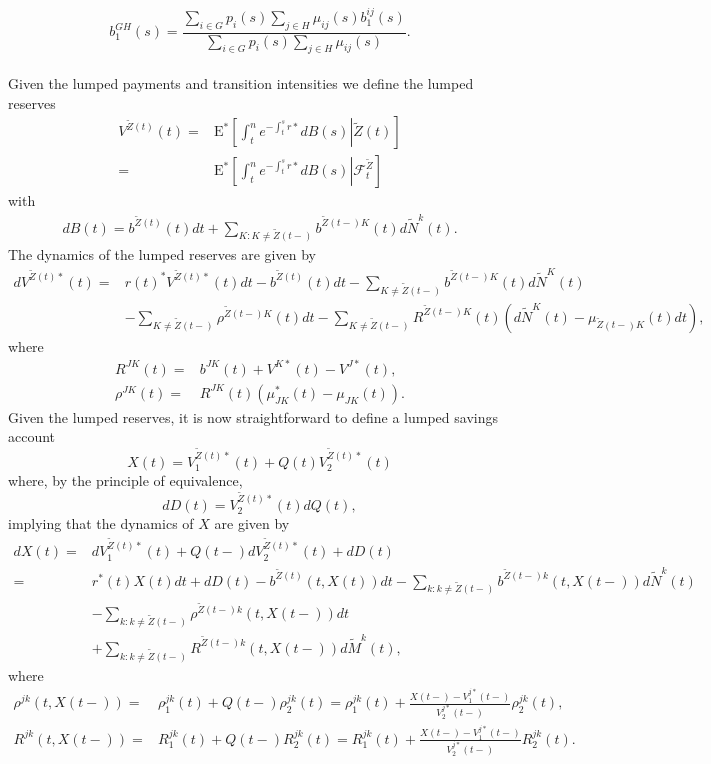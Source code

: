 \documentclass[12pt]{article}
\newcommand{\E}{\text{E}}
\newcommand\ddfrac[2]{\frac{\displaystyle #1}{\displaystyle #2}}
\theoremstyle{my_thm}
\theoremstyle{my_def}
\theoremstyle{my_thm2}
\begin{document}
$$
b_1^{GH}(s)= \ddfrac{\sum_{i \in G} p_i(s)\sum_{j \in H} \mu_{ij}(s)b_1^{ij}(s)}{\sum_{i \in G} p_i(s)\sum_{j \in H} \mu_{ij}(s)}.
$$
\\[12pt]
Given the lumped payments and transition intensities we define the lumped reserves
\begin{align*}
V^{\tilde{Z}(t)}(t)=&\E^* \left. \left[ \int_t^n e^{-\int_t^s r*} dB(s) \right| \tilde{Z}(t) \right]
\\
=&
\E^* \left. \left[ \int_t^n e^{-\int_t^s r*} dB(s) \right| \mathcal{F}_t^{\tilde{Z}} \right]
\end{align*}
with
\begin{align*}
dB(t)=b^{\tilde{Z}(t)}(t) dt +\sum_{K:K \neq \tilde{Z}(t-)} b^{\tilde{Z}(t-)K}(t)d\tilde{N}^k(t).
\end{align*}
The dynamics of the lumped reserves are given by
\begin{align*}
dV^{\tilde{Z}(t)*}(t)=& r(t)^*V^{\tilde{Z}(t)*}(t)dt -b^{\tilde{Z}(t)}(t)dt - \sum_{K \neq \tilde{Z}(t-)} b^{\tilde{Z}(t-)K}(t) d\tilde{N}^K(t)\\
&-\sum_{K \neq \tilde{Z}(t-)} \rho^{\tilde{Z}(t-)K}(t) dt - \sum_{K \neq \tilde{Z}(t-)} R^{\tilde{Z}(t-)K}(t) (d\tilde{N}^K(t)- \mu_{\tilde{Z}(t-)K}(t) dt),
\end{align*}
where
\begin{align*}
R^{JK}(t)=&b^{JK}(t)+V^{K*}(t)-V^{J*}(t),
\\
\rho^{JK}(t)=&R^{JK}(t)(\mu^*_{JK}(t)-\mu_{JK}(t)).
\end{align*}
Given the lumped reserves, it is now straightforward to define a lumped savings account
$$
X(t)=V^{\tilde{Z}(t)*}_1(t)+ Q(t)  V^{\tilde{Z}(t)*}_2(t)
$$
where, by the principle of equivalence,
$$
dD(t)= V_2^{\tilde{Z}(t)*}(t)dQ(t),
$$
implying that the dynamics of $X$ are given by
\begin{align*}
dX(t)=&dV^{\tilde{Z}(t)*}_1(t)+ Q(t-) dV^{\tilde{Z}(t)*}_2(t)+ dD(t)
\\
=&
r^*(t)X(t)dt
 +dD(t)
 -b^{\tilde{Z}(t)}(t,X(t)) dt
- \sum_{k:k \neq \tilde{Z}(t-)} b^{\tilde{Z}(t-)k}(t,X(t-)) d\tilde{N}^k(t)
\nonumber \\
&- \sum_{k:k \neq \tilde{Z}(t-)} \rho^{\tilde{Z}(t-)k}(t,X(t-))dt
\nonumber \\
&+ \sum_{k:k \neq \tilde{Z}(t-)}  R^{\tilde{Z}(t-)k}(t,X(t-))d\tilde{M}^k(t),\label{eq:AAB}
\end{align*}
where
\begin{align*}
\rho^{jk}(t,X(t-))=&\rho_1^{jk}(t)+Q(t-)\rho_2^{jk}(t)=\rho_1^{jk}(t)+\frac{X(t-)-V_1^{j*}(t-)}{V_2^{j*}(t-)}\rho_2^{jk}(t),
\\
R^{jk}(t,X(t-))=&R_1^{jk}(t)+Q(t-)R_2^{jk}(t)=R_1^{jk}(t)+\frac{X(t-)-V_1^{j*}(t-)}{V_2^{j*}(t-)}R_2^{jk}(t).
\end{align*}
\end{document}
